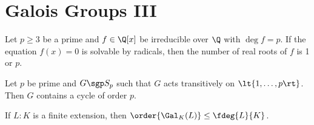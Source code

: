 \documentclass[a4paper]{article}
\begin{document}
\section{Galois Groups III}
\begin{ttheorem}[Kronecker]
  Let \( p \geq 3 \) be a prime and \( f\in \Q[x] \) be irreducible over \( \Q \) with \( \deg f = p \).
  If the equation \( f(x) = 0 \) is solvable by radicals, then the number of real roots of \( f \) is 1 or \( p \).
\end{ttheorem}

\begin{tlemma}
  Let \( p \) be prime and \( G\sgp S_p \) such that \( G \) acts transitively on \( \lt\{ 1,\ldots,p \rt\} \).
  Then \( G \) contains a cycle of order \( p \).
\end{tlemma}

\begin{ttheorem}
  If \( L:K \) is a finite extension, then \( \order{\Gal_K(L)} \leq \fdeg{L}{K} \).
\end{ttheorem}
\end{document}
